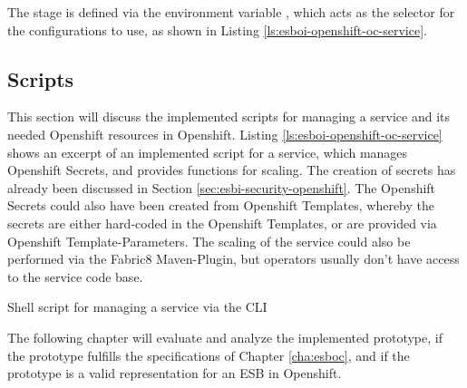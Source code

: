The stage is defined via the environment variable , which acts as the selector for the configurations to use, as shown in Listing \vref{ls:esboi-openshift-oc-service}.

\subsection{Scripts}
\label{sec:esbi-openshift-secrets}
This section will discuss the implemented scripts for managing a service and its needed Openshift resources in Openshift. Listing \vref{ls:esboi-openshift-oc-service} shows an excerpt of an implemented script for a service, which manages Openshift Secrets, and provides functions for scaling. The creation of secrets has already been discussed in Section \vref{sec:esbi-security-openshift}. The Openshift Secrets could also have been created from Openshift Templates, whereby the secrets are either hard-coded in the Openshift Templates, or are provided via Openshift Template-Parameters. The scaling of the service could also be performed via the Fabric8 Maven-Plugin, but operators usually don't have access to the service code base.

\begin{listing}[h]
	\caption{Shell script for managing a service via the CLI}
	\label{ls:esboi-openshift-oc-service}
\end{listing}

The following chapter will evaluate and analyze the implemented prototype, if the prototype fulfills the specifications of Chapter \vref{cha:esboc}, and if the prototype is a valid representation for an ESB in Openshift.


